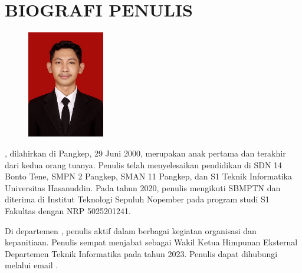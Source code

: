 \chapter*{BIOGRAFI PENULIS}

\vspace{2ex}

\begin{figure}
  \centering
  \vspace{-3ex}
  \includegraphics[width=0.3\textwidth]{gambar/jabalnur.jpeg}
  \vspace{-4ex}
\end{figure}

\name{}, dilahirkan di Pangkep, 29 Juni 2000, merupakan anak pertama dan terakhir
dari kedua orang tuanya. Penulis telah menyelesaikan pendidikan di SDN 14 Bonto Tene, 
SMPN 2 Pangkep, SMAN 11 Pangkep, dan S1 Teknik Informatika Universitas Hasanuddin. Pada
tahun 2020, penulis mengikuti SBMPTN dan diterima di Institut Teknologi Sepuluh Nopember
pada program studi S1 \department{} Fakultas \facultyshort{} \institute{} dengan NRP 5025201241.

Di departemen \department{}, penulis aktif dalam berbagai kegiatan organisasi 
dan kepanitiaan. Penulis sempat menjabat sebagai Wakil Ketua Himpunan Eksternal
Departemen Teknik Informatika pada tahun 2023. Penulis dapat dihubungi melalui 
email \href{mailto:\email}{\email}.

